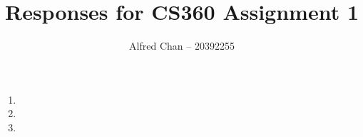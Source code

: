 \documentclass[12pt]{article}
\title{Responses for CS360 Assignment 1}
\author{Alfred Chan -- 20392255}
\begin{document}
\maketitle

\begin{enumerate}
\item
\item
\item
\end{enumerate}
\end{document}
